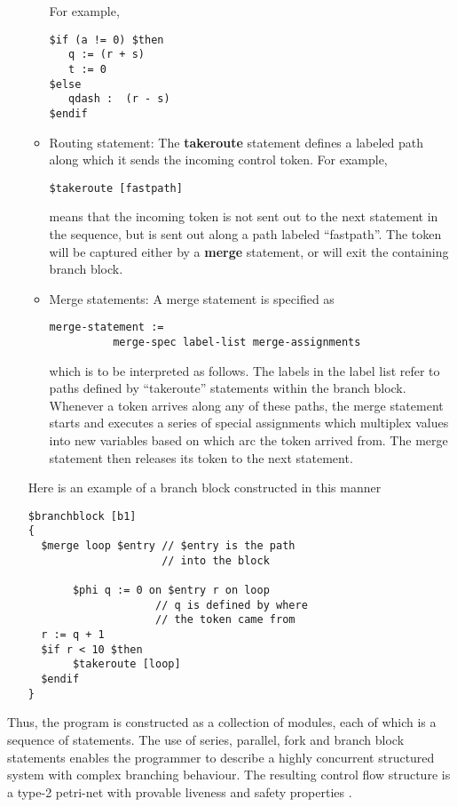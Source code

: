 \documentclass{article}
\begin{document}
\begin{itemize}
\begin{itemize}
\begin{verbatim}
\end{verbatim}
For example, 
\begin{verbatim}
$if (a != 0) $then
   q := (r + s)
   t := 0
$else
   qdash :  (r - s)
$endif
\end{verbatim}
\item Routing statement: The {\bf takeroute} statement
defines a labeled path along which it sends the
incoming control token.  For example,
\begin{verbatim}
$takeroute [fastpath]
\end{verbatim}
means that the incoming token is not sent out to the
next statement in the sequence, but is sent out along
a path labeled ``fastpath''.  The token will be captured
either by a {\bf merge} statement, or will exit the
containing branch block.
\item Merge statements: A merge statement is
specified as 
\begin{verbatim}
merge-statement :=
          merge-spec label-list merge-assignments
\end{verbatim}
which is to be interpreted as follows.  The labels in the label list
refer to paths defined by ``takeroute'' statements within the branch block.
Whenever a token arrives along any of these paths,
the merge statement starts and executes a series of special assignments
which multiplex values into new variables based on which arc the
token arrived from.  The merge statement then releases its token to
the next statement. 
\end{itemize}

Here is an example of a branch block constructed in this manner
\begin{verbatim}
$branchblock [b1] 
{
  $merge loop $entry // $entry is the path 
                     // into the block

       $phi q := 0 on $entry r on loop 
                    // q is defined by where 
                    // the token came from
  r := q + 1
  $if r < 10 $then 
       $takeroute [loop]
  $endif
}
\end{verbatim}

\end{itemize}

Thus, the program is constructed as a collection of modules,
each of which is a sequence of statements.  The use of series,
parallel, fork and branch block
statements enables the programmer to describe a highly concurrent
structured system with complex branching behaviour.  
The resulting control flow structure is a
type-2 petri-net with provable liveness and safety properties \cite{ref:SameerPhD}.
\end{document}
